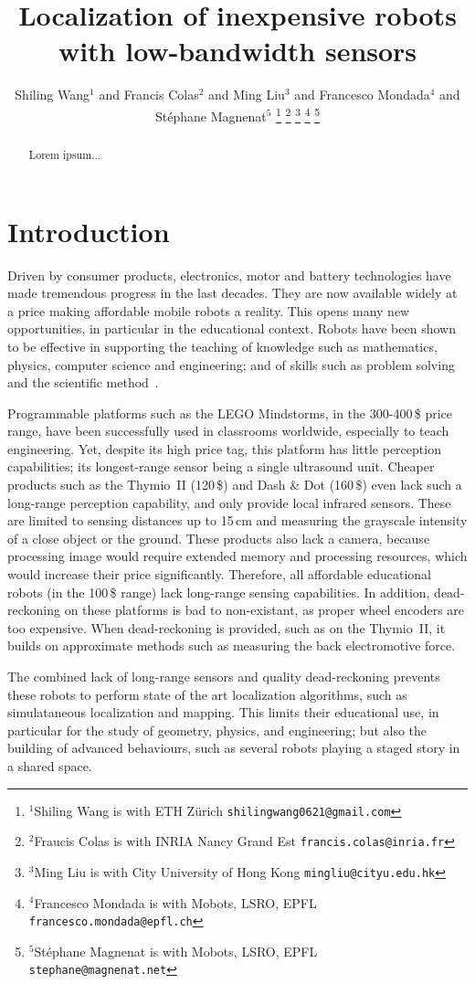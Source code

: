 \documentclass[letterpaper, 10pt, conference]{ieeeconf}
\title{\LARGE \bf
Localization of inexpensive robots with low-bandwidth sensors
}
\author{Shiling Wang$^{1}$ and Francis Colas$^{2}$ and Ming Liu$^{3}$ and Francesco Mondada$^{4}$ and Stéphane Magnenat$^{5}$%
\thanks{$^{1}$Shiling Wang is with ETH Zürich
        {\tt\small shilingwang0621@gmail.com}}%
\thanks{$^{2}$Fraucis Colas is with INRIA Nancy Grand Est
        {\tt\small francis.colas@inria.fr}}%
\thanks{$^{3}$Ming Liu is with City University of Hong Kong
        {\tt\small mingliu@cityu.edu.hk}}%
\thanks{$^{4}$Francesco Mondada is with Mobots, LSRO, EPFL
        {\tt\small francesco.mondada@epfl.ch}}%
\thanks{$^{5}$Stéphane Magnenat is with Mobots, LSRO, EPFL
        {\tt\small stephane@magnenat.net}}%
}
\begin{document}
\maketitle
\thispagestyle{empty}
\pagestyle{empty}

\begin{abstract}
Lorem ipsum...
\end{abstract}

\section{Introduction}

Driven by consumer products, electronics, motor and battery technologies have made tremendous progress in the last decades.
They are now available widely at a price making affordable mobile robots a reality.
This opens many new opportunities, in particular in the educational context.
Robots have been shown to be effective in supporting the teaching of knowledge such as mathematics, physics, computer science and engineering; and of skills such as problem solving and the scientific method~\cite{benitti2012explorin}.

Programmable platforms such as the LEGO Mindstorms, in the 300-400\,\$ price range, have been successfully used in classrooms worldwide, especially to teach engineering.
Yet, despite its high price tag, this platform has little perception capabilities; its longest-range sensor being a single ultrasound unit.
Cheaper products such as the Thymio~II (120\,\$) and Dash \& Dot (160\,\$) even lack such a long-range perception capability, and only provide local infrared sensors.
These are limited to sensing distances up to 15\,cm and measuring the grayscale intensity of a close object or the ground.
These products also lack a camera, because processing image would require extended memory and processing resources, which would increase their price significantly.
Therefore, all affordable educational robots (in the 100\,\$ range) lack long-range sensing capabilities.
In addition, dead-reckoning on these platforms is bad to non-existant, as proper wheel encoders are too expensive.
When dead-reckoning is provided, such as on the Thymio~II, it builds on approximate methods such as measuring the back electromotive force.

The combined lack of long-range sensors and quality dead-reckoning prevents these robots to perform state of the art localization algorithms, such as simulataneous localization and mapping.
This limits their educational use, in particular for the study of geometry, physics, and engineering; but also the building of advanced behaviours, such as several robots playing a staged story in a shared space.
\end{document}
